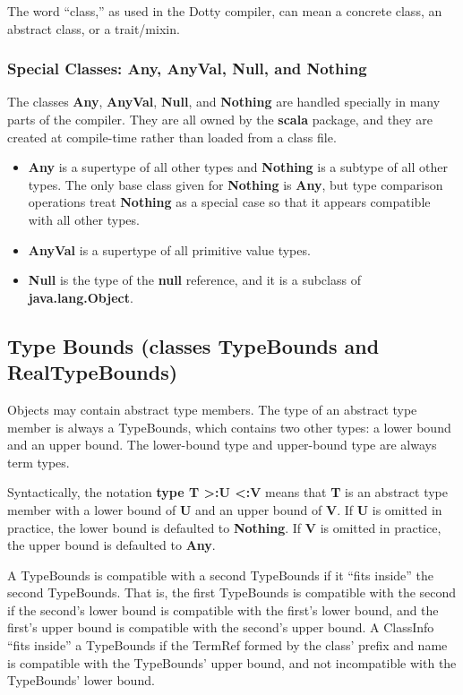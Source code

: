 \documentclass[11pt]{report}
\newcommand{\cdf}{\bf\ttfamily} %
\newcommand{\cd}{\cdf\small}  %
\begin{document}
The word ``class,'' as used in the Dotty compiler, can mean a concrete class, an abstract class, or a trait/mixin.

\subsubsection{Special Classes: Any, AnyVal, Null, and Nothing}

The classes {\cd Any}, {\cd AnyVal}, {\cd Null}, and {\cd Nothing} are handled specially in many parts of the compiler. They are all owned by the {\cd scala} package, and they are created at compile-time rather than loaded from a class file.

\begin{itemize}

\item {\cd Any} is a supertype of all other types and {\cd Nothing} is a subtype of all other types. The only base class given for {\cd Nothing} is {\cd Any}, but type comparison operations treat {\cd Nothing} as a special case so that it appears compatible with all other types.

\item {\cd AnyVal} is a supertype of all primitive value types.

\item {\cd Null} is the type of the {\cd null} reference, and it is a subclass of {\cd java.lang.Object}.

\end{itemize}

\subsection{Type Bounds (classes TypeBounds and RealTypeBounds)}

Objects may contain abstract type members.
The type of an abstract type member is always a TypeBounds, which contains two other types: a lower bound and an upper bound. The lower-bound type and upper-bound type are always term types.

Syntactically, the notation {\cd type T >:U <:V} means that {\cd T} is an abstract type member with a lower bound of {\cd U} and an upper bound of {\cd V}. If {\cd U} is omitted in practice, the lower bound is defaulted to {\cd Nothing}. If {\cd V} is omitted in practice, the upper bound is defaulted to {\cd Any}.

A TypeBounds is compatible with a second TypeBounds if it ``fits inside'' the second TypeBounds. That is, the first TypeBounds is compatible with the second if the second's lower bound is compatible with the first's lower bound, and the first's upper bound is compatible with the second's upper bound. A ClassInfo ``fits inside'' a TypeBounds if the TermRef formed by the class' prefix and name is compatible with the TypeBounds' upper bound, and not incompatible with the TypeBounds' lower bound.
\end{document}
